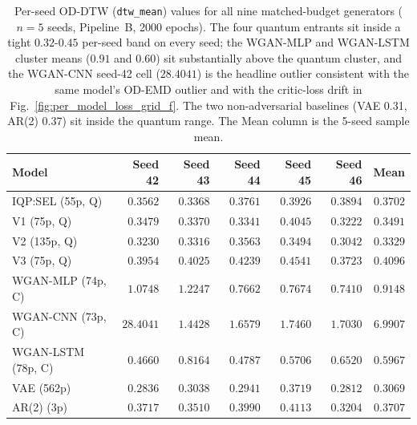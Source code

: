 \begin{table}[!htbp]
\centering
\caption{Per-seed OD-DTW (\texttt{dtw\_mean}) values for all nine
matched-budget generators ($n=5$ seeds, Pipeline~B, 2000 epochs).
The four quantum entrants sit inside a tight $0.32$-$0.45$
per-seed band on every seed; the WGAN-MLP and WGAN-LSTM cluster
means ($0.91$ and $0.60$) sit substantially above the quantum
cluster, and the WGAN-CNN seed-42 cell ($28.4041$) is the
headline outlier consistent with the same model's OD-EMD outlier
and with the critic-loss drift in Fig.~\ref{fig:per_model_loss_grid_f}.
The two non-adversarial baselines (VAE 0.31, AR(2) 0.37) sit inside
the quantum range. The Mean column is the 5-seed sample mean.}
\label{tbl:per_seed_od_dtw}
\scriptsize
\setlength{\tabcolsep}{6pt}
\begin{tabular}{@{}lrrrrrr@{}}
\toprule
\textbf{Model} & \textbf{Seed 42} & \textbf{Seed 43} & \textbf{Seed 44} & \textbf{Seed 45} & \textbf{Seed 46} & \textbf{Mean} \\
\midrule
IQP:SEL (55p, Q) & $0.3562$ & $0.3368$ & $0.3761$ & $0.3926$ & $0.3894$ & $0.3702$ \\
V1 (75p, Q) & $0.3479$ & $0.3370$ & $0.3341$ & $0.4045$ & $0.3222$ & $0.3491$ \\
V2 (135p, Q) & $0.3230$ & $0.3316$ & $0.3563$ & $0.3494$ & $0.3042$ & $0.3329$ \\
V3 (75p, Q) & $0.3954$ & $0.4025$ & $0.4239$ & $0.4541$ & $0.3723$ & $0.4096$ \\
WGAN-MLP (74p, C) & $1.0748$ & $1.2247$ & $0.7662$ & $0.7674$ & $0.7410$ & $0.9148$ \\
WGAN-CNN (73p, C) & $28.4041$ & $1.4428$ & $1.6579$ & $1.7460$ & $1.7030$ & $6.9907$ \\
WGAN-LSTM (78p, C) & $0.4660$ & $0.8164$ & $0.4787$ & $0.5706$ & $0.6520$ & $0.5967$ \\
VAE (562p) & $0.2836$ & $0.3038$ & $0.2941$ & $0.3719$ & $0.2812$ & $0.3069$ \\
AR(2) (3p) & $0.3717$ & $0.3510$ & $0.3990$ & $0.4113$ & $0.3204$ & $0.3707$ \\
\bottomrule
\end{tabular}
\end{table}

